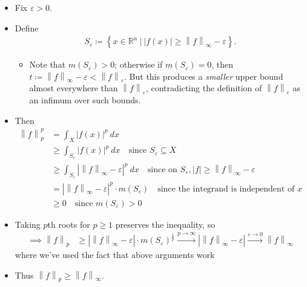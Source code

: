 \begin{solution}
\begin{itemize}
  \begin{itemize}
  \item
    Fix \(\varepsilon > 0\).
  \item
    Define
    \begin{align*}
    S_\varepsilon \coloneqq\left\{{x\in {\mathbb{R}}^n {~\mathrel{\Big|}~}{\left\lvert {f(x)} \right\rvert} \geq {\left\lVert {f} \right\rVert}_\infty - \varepsilon}\right\}
    .\end{align*}

    \begin{itemize}
    \tightlist
    \item
      Note that \(m(S_\varepsilon) > 0\); otherwise if
      \(m(S_\varepsilon) = 0\), then
      \(t\coloneqq{\left\lVert {f} \right\rVert}_\infty - \varepsilon< {\left\lVert {f} \right\rVert}_\varepsilon\).
      But this produces a \emph{smaller} upper bound almost everywhere
      than \({\left\lVert {f} \right\rVert}_\varepsilon\), contradicting
      the definition of \({\left\lVert {f} \right\rVert}_\varepsilon\)
      as an infimum over such bounds.
    \end{itemize}
  \item
    Then
    \begin{align*}
    {\left\lVert {f} \right\rVert}_p^p 
    &= \int_X {\left\lvert {f(x)} \right\rvert}^p ~dx \\
    &\geq \int_{S_\varepsilon} {\left\lvert {f(x)} \right\rvert}^p ~dx \quad\text{since } S_\varepsilon\subseteq X \\
    &\geq \int_{S_\varepsilon} {\left\lvert {{\left\lVert {f} \right\rVert}_\infty - \varepsilon} \right\rvert}^p ~dx \quad\text{since on } S_\varepsilon, {\left\lvert {f} \right\rvert} \geq {\left\lVert {f} \right\rVert}_\infty - \varepsilon\\
    &= {\left\lvert {{\left\lVert {f} \right\rVert}_\infty - \varepsilon} \right\rvert}^p \cdot m(S_\varepsilon) \quad\text{since the integrand is independent of }x \\
    & \geq 0 \quad\text{since } m(S_\varepsilon) > 0
    \end{align*}
  \item
    Taking \(p\)th roots for \(p\geq 1\) preserves the inequality, so
    \begin{align*}
    \implies {\left\lVert {f} \right\rVert}_p &\geq {\left\lvert {{\left\lVert {f} \right\rVert}_\infty - \varepsilon} \right\rvert} \cdot m(S_\varepsilon)^{\frac 1 p} 
    \overset{p\to\infty}\to {\left\lvert {{\left\lVert {f} \right\rVert}_\infty - \varepsilon} \right\rvert} 
    \overset{\varepsilon \to 0}\to {\left\lVert {f} \right\rVert}_\infty
    \end{align*}
    where we've used the fact that above arguments work
  \item
    Thus
    \({\left\lVert {f} \right\rVert}_p \geq {\left\lVert {f} \right\rVert}_\infty\).
  \end{itemize}
\end{itemize}

\end{solution}

